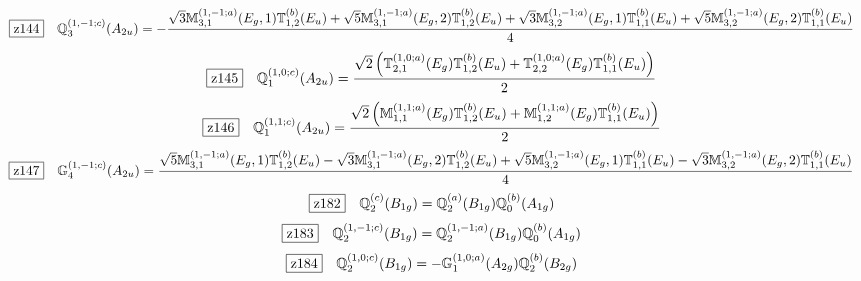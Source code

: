 \documentclass[fleqn,10pt,landscape]{jsarticle}
\begin{document}
\begin{dmath*}
\hspace*{3mm}\fbox{z144}\quad \mathbb{Q}_{3}^{(1,-1;c)}(A_{2u})=- \frac{\sqrt{3} \mathbb{M}_{3,1}^{(1,-1;a)}(E_{g},1) \mathbb{T}_{1,2}^{(b)}(E_{u}) + \sqrt{5} \mathbb{M}_{3,1}^{(1,-1;a)}(E_{g},2) \mathbb{T}_{1,2}^{(b)}(E_{u}) + \sqrt{3} \mathbb{M}_{3,2}^{(1,-1;a)}(E_{g},1) \mathbb{T}_{1,1}^{(b)}(E_{u}) + \sqrt{5} \mathbb{M}_{3,2}^{(1,-1;a)}(E_{g},2) \mathbb{T}_{1,1}^{(b)}(E_{u})}{4}
\end{dmath*}
\begin{dmath*}
\hspace*{3mm}\fbox{z145}\quad \mathbb{Q}_{1}^{(1,0;c)}(A_{2u})=\frac{\sqrt{2} \left(\mathbb{T}_{2,1}^{(1,0;a)}(E_{g}) \mathbb{T}_{1,2}^{(b)}(E_{u}) + \mathbb{T}_{2,2}^{(1,0;a)}(E_{g}) \mathbb{T}_{1,1}^{(b)}(E_{u})\right)}{2}
\end{dmath*}
\begin{dmath*}
\hspace*{3mm}\fbox{z146}\quad \mathbb{Q}_{1}^{(1,1;c)}(A_{2u})=\frac{\sqrt{2} \left(\mathbb{M}_{1,1}^{(1,1;a)}(E_{g}) \mathbb{T}_{1,2}^{(b)}(E_{u}) + \mathbb{M}_{1,2}^{(1,1;a)}(E_{g}) \mathbb{T}_{1,1}^{(b)}(E_{u})\right)}{2}
\end{dmath*}
\begin{dmath*}
\hspace*{3mm}\fbox{z147}\quad \mathbb{G}_{4}^{(1,-1;c)}(A_{2u})=\frac{\sqrt{5} \mathbb{M}_{3,1}^{(1,-1;a)}(E_{g},1) \mathbb{T}_{1,2}^{(b)}(E_{u}) - \sqrt{3} \mathbb{M}_{3,1}^{(1,-1;a)}(E_{g},2) \mathbb{T}_{1,2}^{(b)}(E_{u}) + \sqrt{5} \mathbb{M}_{3,2}^{(1,-1;a)}(E_{g},1) \mathbb{T}_{1,1}^{(b)}(E_{u}) - \sqrt{3} \mathbb{M}_{3,2}^{(1,-1;a)}(E_{g},2) \mathbb{T}_{1,1}^{(b)}(E_{u})}{4}
\end{dmath*}
\begin{dmath*}
\hspace*{3mm}\fbox{z182}\quad \mathbb{Q}_{2}^{(c)}(B_{1g})=\mathbb{Q}_{2}^{(a)}(B_{1g}) \mathbb{Q}_{0}^{(b)}(A_{1g})
\end{dmath*}
\begin{dmath*}
\hspace*{3mm}\fbox{z183}\quad \mathbb{Q}_{2}^{(1,-1;c)}(B_{1g})=\mathbb{Q}_{2}^{(1,-1;a)}(B_{1g}) \mathbb{Q}_{0}^{(b)}(A_{1g})
\end{dmath*}
\begin{dmath*}
\hspace*{3mm}\fbox{z184}\quad \mathbb{Q}_{2}^{(1,0;c)}(B_{1g})=- \mathbb{G}_{1}^{(1,0;a)}(A_{2g}) \mathbb{Q}_{2}^{(b)}(B_{2g})
\end{dmath*}
\end{document}

